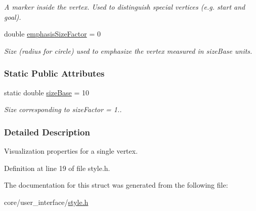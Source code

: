 \begin{DoxyCompactItemize}
\begin{DoxyCompactList}\small\item\em A marker inside the vertex. Used to distinguish special vertices (e.\+g. start and goal). \end{DoxyCompactList}\item 
double \hyperlink{structslb_1_1core_1_1ui_1_1VertexStyle_a31d94cf685cae91969b63b7a7414646f}{emphasis\+Size\+Factor} = 0\hypertarget{structslb_1_1core_1_1ui_1_1VertexStyle_a31d94cf685cae91969b63b7a7414646f}{}\label{structslb_1_1core_1_1ui_1_1VertexStyle_a31d94cf685cae91969b63b7a7414646f}

\begin{DoxyCompactList}\small\item\em Size (radius for circle) used to emphasize the vertex measured in size\+Base units. \end{DoxyCompactList}\end{DoxyCompactItemize}
\subsubsection*{Static Public Attributes}
\begin{DoxyCompactItemize}
\item 
static double \hyperlink{structslb_1_1core_1_1ui_1_1VertexStyle_af155f7b4385455ae0bfe1610e9f0512d}{size\+Base} = 10\hypertarget{structslb_1_1core_1_1ui_1_1VertexStyle_af155f7b4385455ae0bfe1610e9f0512d}{}\label{structslb_1_1core_1_1ui_1_1VertexStyle_af155f7b4385455ae0bfe1610e9f0512d}

\begin{DoxyCompactList}\small\item\em Size corresponding to size\+Factor = 1.. \end{DoxyCompactList}\end{DoxyCompactItemize}


\subsubsection{Detailed Description}
Visualization properties for a single vertex. 

Definition at line 19 of file style.\+h.



The documentation for this struct was generated from the following file\+:\begin{DoxyCompactItemize}
\item 
core/user\+\_\+interface/\hyperlink{style_8h}{style.\+h}\end{DoxyCompactItemize}
